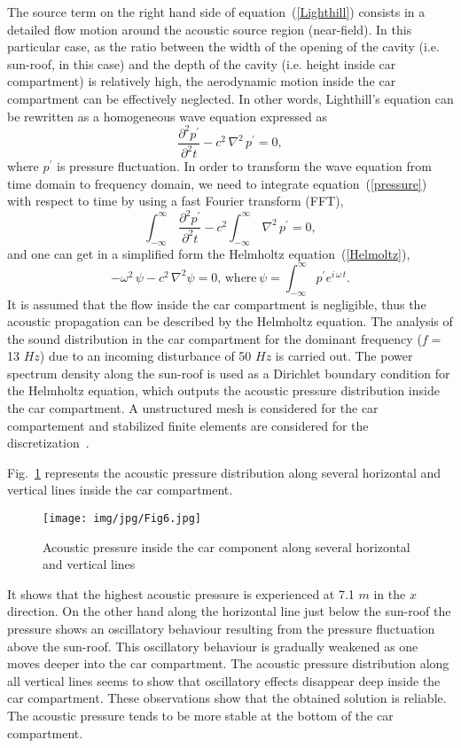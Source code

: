 \documentclass[10pt]{article}
\theoremstyle{plain}
\theoremstyle{definition}
\theoremstyle{remark}
\begin{document}
%
The source term on the right hand side of equation~(\ref{Lighthill}) consists in a detailed flow motion around the acoustic source region (near-field).
In this particular case, as the ratio between the width of the opening of the cavity (i.e. sun-roof, in this case) and the depth of the cavity (i.e. height inside car compartment) is relatively high, the aerodynamic motion inside the car compartment can be effectively neglected.
In other words, Lighthill's equation can be rewritten as a homogeneous wave equation expressed as
%
\begin{equation}
\frac{\partial^{2} p^{'}}{\partial^{2} t} - c^{2} \, \nabla^{2} \, p^{'} = 0, \label{pressure}
\end{equation}
%
where $p^{'}$ is pressure fluctuation.
In order to transform the wave equation from time domain to frequency domain, we need to integrate equation~(\ref{pressure}) with respect to time by using a fast Fourier transform (FFT),
%
\begin{equation}
\int^{\infty}_{-\infty} \, \frac{\partial^{2} p^{'}}{\partial^{2} t} - c^{2} \int^{\infty}_{-\infty} \, \nabla^{2} \, p^{'} = 0, \label{pressurefft}
\end{equation}
%
and one can get in a simplified form the Helmholtz equation~(\ref{Helmoltz}),
%
\begin{equation}
- \omega^2 \, \psi - c^2 \, \nabla^2 \psi = 0 \mbox{, where} \, \psi = \int^{\infty}_{-\infty} p^{'} e^{i \, \omega \, t}. \label{Helmoltz}
\end{equation}
%
It is assumed that the flow inside the car compartment is negligible, thus the acoustic propagation can be described by the Helmholtz equation.
The analysis of the sound distribution in the car compartment for the dominant frequency ($f =$ 13 $Hz$) due to an incoming disturbance of 50 $Hz$ is carried out.
The power spectrum density along the sun-roof is used as a Dirichlet boundary condition for the Helmholtz equation, which outputs the acoustic pressure distribution inside the car compartment.
A unstructured mesh is considered for the car compartement and stabilized finite elements are considered for the discretization~\cite{magoules:journal-auth:7}.

Fig.~\ref{Fig6} represents the acoustic pressure distribution along several horizontal and vertical lines inside the car compartment.
%
\begin{figure}[htbp]
\centering
\texttt{[image: img/jpg/Fig6.jpg]}
\caption{Acoustic pressure inside the car component along several horizontal and vertical lines}\label{Fig6}
\end{figure}
%
It shows that the highest acoustic pressure is experienced at 7.1 $m$ in the $x$ direction.
On the other hand along the horizontal line just below the sun-roof the pressure shows an oscillatory behaviour resulting from the pressure fluctuation above the sun-roof.
This oscillatory behaviour is gradually weakened as one moves deeper into the car compartment.
The acoustic pressure distribution along all vertical lines seems to show that oscillatory effects disappear deep inside the car compartment.
These observations show that the obtained solution is reliable.
The acoustic pressure tends to be more stable at the bottom of the car compartment.
\end{document}
